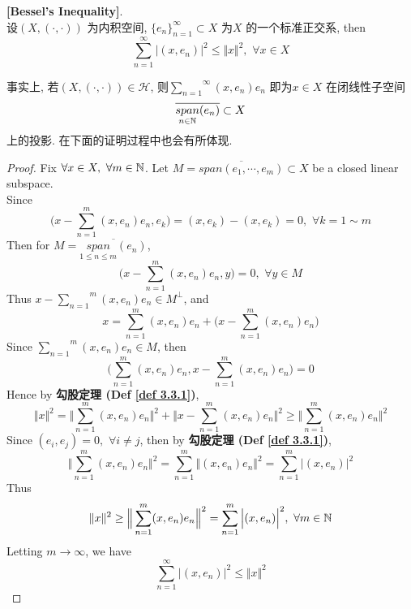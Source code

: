 	\begin{thm}\label{thm 3.4.1}
		\textbf{[Bessel's Inequality]}. \\
		设$(X , (\cdot , \cdot))$ 为内积空间, $\{ e_n \}_{n = 1}^{\infty} \subset X$ 为$X$ 的一个标准正交系, then
		\[ \sum_{n = 1}^{\infty} \Big| (x , e_n) \Big|^2 \leq \Vert x \Vert^2 , \,\, \forall x \in X \]
		
		\vspace{2em}
		
		\begin{rmk}
			事实上, 若$(X , (\cdot , \cdot)) \in \mathcal{H}$, 则$\overset{\infty}{\underset{n = 1}{\sum}} (x , e_n) e_n$ 即为$x \in X$ 在闭线性子空间
			\[ \overline{\underset{n \in \mathbb{N}}{span}(e_n)} \subset X \]
			上的投影. 在下面的证明过程中也会有所体现. 
		\end{rmk}
	
		\newpage
		
		\begin{proof}
			Fix $\forall x \in X , \,\, \forall m \in \mathbb{N}$. Let $M = \overline{span(e_1 , \cdots , e_m)} \subset X$ be a closed linear subspace. \\
			Since
			\[ \Big( x - \sum_{n = 1}^{m} (x , e_n) e_n , e_k \Big) 
			= (x , e_k) - (x , e_k) 
			= 0 , \,\, \forall k = 1 \sim m \]
			Then for $M = \overline{\underset{1 \leq n \leq m}{span} (e_n)}$, 
			\[ \Big( x - \sum_{n = 1}^{m} (x , e_n) e_n , y \Big) = 0 , \,\, \forall y \in M  \]
			Thus $x - \overset{m}{\underset{n = 1}{\sum}} (x , e_n) e_n \in M^{\perp}$, and
			\[ x = \sum_{n = 1}^{m} (x , e_n) e_n + \Big( x - \sum_{n = 1}^{m} (x , e_n) e_n \Big) \]
			Since $\overset{m}{\underset{n = 1}{\sum}} (x , e_n) e_n \in M$, then
			\[ \Big( \sum_{n = 1}^{m} (x , e_n) e_n , x - \sum_{n = 1}^{m} (x , e_n) e_n \Big) = 0 \]
			Hence by \textbf{勾股定理 (Def \ref{def 3.3.1})}, 
			\[
				\Vert x \Vert^2 
				= \Big\Vert \sum_{n = 1}^{m} (x , e_n) e_n \Big\Vert^2 + \Big\Vert x - \sum_{n = 1}^{m} (x , e_n) e_n \Big\Vert^2 
				\geq \Big\Vert \sum_{n = 1}^{m} (x , e_n) e_n \Big\Vert^2
			\]
			Since $(e_i , e_j) = 0 , \,\, \forall i \neq j$, then by \textbf{勾股定理 (Def \ref{def 3.3.1})}, 
			\[ \Big\Vert \sum_{n = 1}^{m} (x , e_n) e_n \Big\Vert^2 
			= \sum_{n = 1}^{m} \Big\Vert (x , e_n) e_n \Big\Vert^2 
			= \sum_{n = 1}^{m} \Big| (x , e_n) \Big|^2 \]
			Thus
			\[ \Vert x \Vert^2 
			\geq \Big\Vert \sum_{n = 1}^{m} (x , e_n) e_n \Big\Vert^2 
			= \sum_{n = 1}^{m} \Big| (x , e_n) \Big|^2 , \,\, \forall m \in \mathbb{N} \]
			Letting $m \to \infty$, we have
			\[ \sum_{n = 1}^{\infty} \Big| (x , e_n) \Big|^2 \leq \Vert x \Vert^2 \]
		\end{proof}
	\end{thm}

